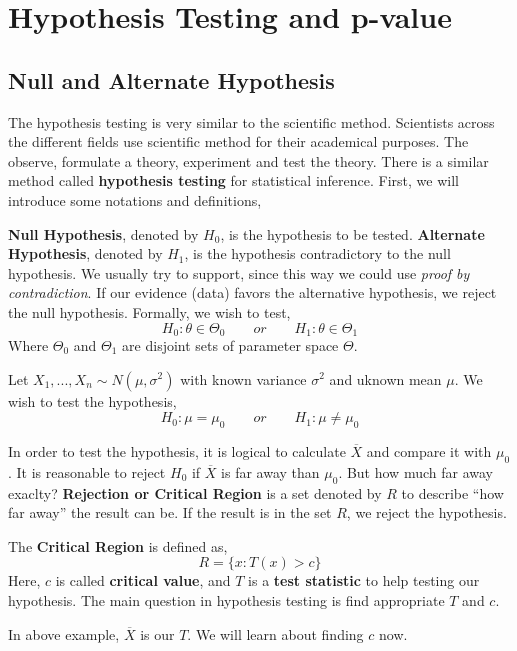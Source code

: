 \chapter{Hypothesis Testing and p-value}
\section{Null and Alternate Hypothesis}
The hypothesis testing is very similar to the scientific method.
Scientists across the different fields use scientific method for their academical purposes.  The observe, formulate a theory, experiment and test the theory. There is a similar method called \textbf{hypothesis testing} for statistical inference. First, we will introduce some notations and definitions,
\begin{definition}
    \textbf{Null Hypothesis}, denoted by $H_0$, is the hypothesis to be tested.\newline
    \textbf{Alternate Hypothesis}, denoted by $H_1$, is the hypothesis contradictory to the null hypothesis. We usually try to support, since this way we could use \textit{proof by contradiction}. \newline
    If our evidence (data) favors the  alternative hypothesis, we reject the null hypothesis. Formally, we wish to test,
    \[H_0  : \theta  \in \Theta_0 \qquad or \qquad H_1 : \theta \in \Theta_1 \]
    Where $\Theta_0$ and $\Theta_1$ are disjoint sets of parameter space $\Theta$.
\end{definition}
\begin{example}
    Let $X_1,...,X_n \sim N(\mu, \sigma^2)$  with known variance $\sigma^2$ and uknown mean $\mu$. We wish to test the hypothesis,
    \[ H_0: \mu = \mu_0 \qquad or \qquad H_1: \mu  \neq \mu_0 \]
\end{example}
In order to test the hypothesis, it is logical to calculate $\overline{X}$ and compare it with $\mu_0$. It is reasonable to reject $H_0$ if $\overline{X}$ is far away than $\mu_0$. But how much far away exaclty? \newline
\textbf{Rejection or Critical Region} is a set denoted by $R$ to describe ``how far away'' the result can be. If the result is in the set $R$, we reject the hypothesis.
\begin{definition}
    The \textbf{Critical Region} is defined as,
    \[ R = \biggl \{ x : T(x) > c \biggr \} \]
    Here, $c$ is called \textbf{critical value}, and $T$ is a \textbf{test statistic} to help testing our hypothesis.
    The main question in hypothesis testing is find appropriate $T$ and $c$. 
\end{definition}
In above example, $\overline{X}$ is our $T$. We will learn about finding $c$ now.
\newline

